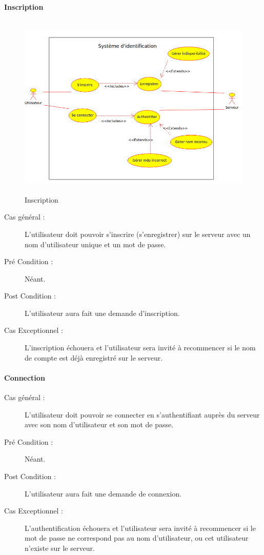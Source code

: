 \documentclass[a4paper]{article}
\begin{document}
\paragraph{Inscription}
\begin{figure}[h]
   \caption{\label{1} Inscription}
   \begin{center}
   \includegraphics[height=250pt]{uml/id.png}
   \end{center}
\end{figure}
\begin{description}
\item[Cas général :] L'\gls{utilisateur} doit pouvoir s'inscrire (s'enregistrer) sur le \gls{serveur} avec un nom d'\gls{utilisateur} unique et un mot de passe.
\item[Pré Condition  :] Néant.
\item[Post Condition :] L'\gls{utilisateur} aura fait une demande d'inscription.
\item[Cas Exceptionnel :] L'inscription échouera et l'\gls{utilisateur} sera invité à recommencer si le nom de compte est déjà enregistré sur le \gls{serveur}.
\end{description}

\paragraph{Connection}
\begin{description}
\item[Cas général :] L'\gls{utilisateur} doit pouvoir se connecter en s'authentifiant auprès du \gls{serveur} avec son nom d'\gls{utilisateur} et son mot de passe.
\item[Pré Condition  :] Néant.
\item[Post Condition :] L'\gls{utilisateur} aura fait une demande de connexion.
\item[Cas Exceptionnel :] L'authentification échouera et l'\gls{utilisateur} sera invité à recommencer si le mot de passe ne correspond pas au nom d'\gls{utilisateur}, ou cet \gls{utilisateur} n'existe sur le \gls{serveur}.
\end{description}
\end{document}
